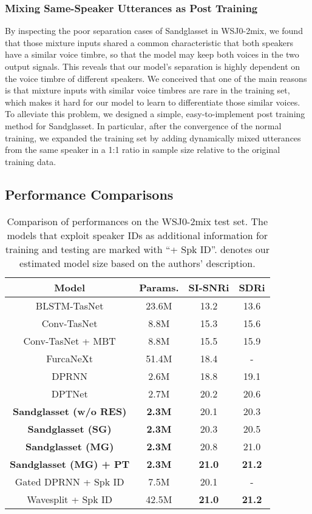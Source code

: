 \documentclass{article}
\begin{document}
\subsubsection{Mixing Same-Speaker Utterances as Post Training}
\label{sec:3.1.3}
By inspecting the poor separation cases of Sandglasset in WSJ0-2mix, we found that those mixture inputs shared a common characteristic that both speakers have a similar voice timbre, so that the model may keep both voices in the two output signals. This reveals that our model's separation is highly dependent on the voice timbre of different speakers. We conceived that one of the main reasons is that mixture inputs with similar voice timbres are rare in the training set, which makes it hard for our model to learn to differentiate those similar voices. To alleviate this problem, we designed a simple, easy-to-implement post training method for Sandglasset. In particular, after the convergence of the normal training, we expanded the training set by adding dynamically mixed utterances from the same speaker in a 1:1 ratio in sample size relative to the original training data.

\subsection{Performance Comparisons}
\begin{table}[t]
\caption{Comparison of performances on the WSJ0-2mix test set. The models that exploit speaker IDs as additional information for training and testing are marked with ``+ Spk ID''.  denotes our estimated model size based on the authors' description. }
\label{tab:1}
\centering

\begin{tabular}{c|c|c|c}
\hline
\textbf{Model} & \textbf{Params.} & \textbf{SI-SNRi} & \textbf{SDRi} \\
\hline
{BLSTM-TasNet \cite{luo2018tasnet}} & 23.6M & 13.2 & 13.6 \\
{Conv-TasNet \cite{luo2019conv}} & 8.8M & 15.3 & 15.6 \\
{Conv-TasNet + MBT \cite{lam2020mixup}} & 8.8M & 15.5 & 15.9 \\
{FurcaNeXt \cite{zhang2020furcanext}} & 51.4M & 18.4 & - \\
{DPRNN \cite{luo2019dual}} & 2.6M & 18.8 & 19.1 \\
{DPTNet \cite{chen2020dual}} & 2.7M & 20.2 & 20.6 \\
{\bf{Sandglasset (w/o RES)}} & \bf{2.3M} & 20.1 & 20.3 \\
{\bf{Sandglasset (SG)}} & \bf{2.3M} & 20.3 & 20.5 \\
{\bf{Sandglasset (MG)}} & \bf{2.3M} & 20.8 & 21.0 \\
{\bf{Sandglasset (MG) + PT}} & \bf{2.3M} & \bf{21.0} & \bf{21.2} \\ \hline
{Gated DPRNN + Spk ID \cite{nachmani2020voice}} & 7.5M & 20.1 & - \\
{Wavesplit + Spk ID \cite{zeghidour2020wavesplit}} & 42.5M & \bf{21.0} & \bf{21.2} \\
\hline
\end{tabular}
\end{table}
\end{document}
